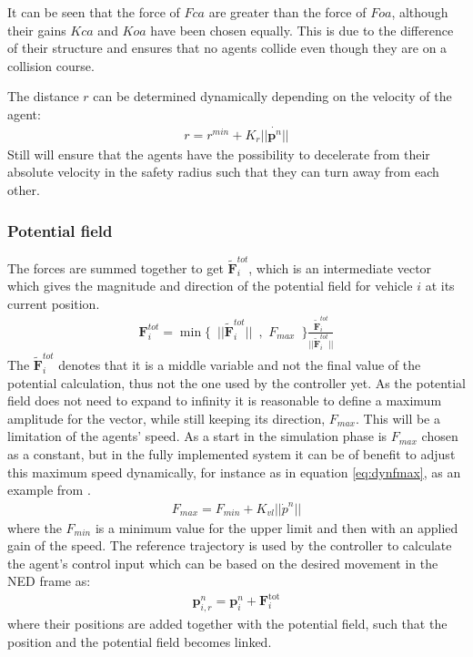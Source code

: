 It can be seen that the force of $Fca$ are greater than the force of $Foa$, although their gains $Kca$ and $Koa$ have been chosen equally. This is due to the difference of their structure and ensures that no agents collide even though they are on a collision course.

The distance $r$ can be determined
dynamically depending on the velocity of the agent:
\begin{align}
r = r^{min} + K_r||\dot{\mathbf{p}^n}||
\end{align}
Still will ensure that the agents have the possibility to decelerate from their absolute velocity in the safety radius such that they can turn away from each other.


\subsubsection{Potential field}
The forces are summed together to get
$\tilde{\mathbf{F}}_i^{tot}$, which is an intermediate vector which gives the magnitude and direction of the
potential field for vehicle $i$ at its current position.
\begin{align}
  \mathbf{F}_i^{tot} = \min\{\,\,\,||\tilde{\mathbf{F}}_i^{tot}||\,\,\,,\,\,F_{max}\,\,\,\}\frac{\tilde{\mathbf{F}}_i^{tot}}{||\tilde{\mathbf{F}}_i^{tot}||}
\end{align}
The $\tilde{\mathbf{F}}_i^{tot}$ denotes that it is a middle variable and not the final value of the potential calculation, thus not the one used by the controller yet.
As the potential field does not need to expand to infinity it is reasonable to define a maximum amplitude for the vector, while still keeping its direction, $F_{max}$. This will be a limitation of the agents' speed. As a start in the simulation phase is $F_{max}$ chosen as a constant, but in the fully implemented system it can be of benefit to adjust this maximum speed dynamically, for instance as in equation \ref{eq:dynfmax}, as an example from \citep{UAVff3dpf}.
\begin{align}
F_{max} = F_{min} + K_{vl}||\dot{p}^n||
\label{eq:dynfmax}
\end{align}
where the $F_{min}$ is a minimum value for the upper limit and then with an applied gain of the speed. 
The reference trajectory is used by the controller to calculate the agent's control input which can be based on the desired movement in the NED frame as:
\begin{align}
  \mathbf{p}_{i,r}^n = \mathbf{p}_i^n + \mathbf{F}_i ^\text{tot}
\end{align}
where their positions are added together with the potential field, such that the position and the potential field becomes linked.

